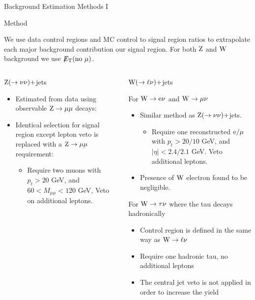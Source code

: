 \documentclass[8pt]{beamer}
\newcommand\Fontvi{\fontsize{6}{7.2}\selectfont}
\newcommand{\met}{\displaystyle{\not} E_{\rm T}}
\newcommand{\W}{{\rm W}}
\newcommand{\Z}{{\rm Z}}
\begin{document}
\begin{frame}{Background Estimation Methods I}
\Fontvi 

\begin{block}{Method}
 
We use data control regions and MC control to signal region ratios to extrapolate each major background contribution our signal region. For both $\Z$ and $\W$ background we use $\met(\text{no }\mu)$.

\end{block}
\vspace{-.3cm}

\begin{columns}  
\begin{block}{$\Z (\rightarrow \nu \nu)+$jets}

\begin{itemize}
 \item Estimated from data using observable $\Z \rightarrow \mu \mu$ decays:
 \item Identical selection for signal region except lepton veto is replaced with a $\Z \rightarrow \mu \mu$ requirement:
 \begin{itemize}
  \item {\Fontvi Require two muons with $p_t > 20 $ GeV, and $60 < M_{\mu\mu}<120$ GeV, Veto on additional leptons.}
 \end{itemize}
\end{itemize}

\end{block}

\begin{block}{$\W (\rightarrow \ell \nu)+$jets}

For $\W \rightarrow {\rm e} \nu$ and $\W \rightarrow \mu \nu$ 
\begin{itemize}
 \item Similar method as $\Z (\rightarrow \nu \nu)+$jets.
 \begin{itemize}
  \item {\Fontvi  Require one reconstructed ${\rm e}/\mu$ with $p_t > 20/10 $ GeV, and $|\eta| < 2.4/2.1$ GeV. Veto additional leptons.}
 \end{itemize}
 \item Presence of $\W$ electron found to be negligible.
\end{itemize}

For $\W \rightarrow \tau\nu$ where the tau decays hadronically
\begin{itemize}
 \item Control region is defined in the same way as $\W \rightarrow \ell \nu$
 \item Require one hadronic tau, no additional leptons
 \item The central jet veto is not applied in order to increase the yield
\end{itemize}


\end{block}
\end{columns}
\end{frame}
\end{document}
